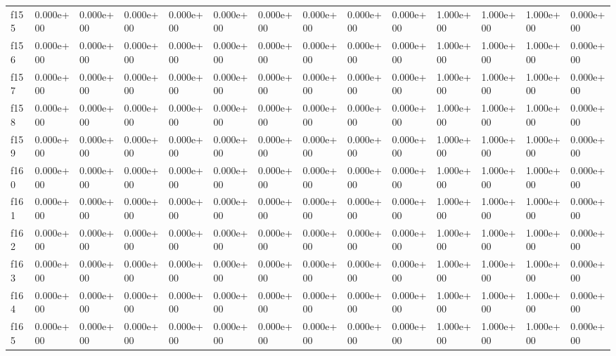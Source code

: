 \begin{table}
\begin{tabular}{llllllllllllll}
f155 & 0.000e+00 & 0.000e+00 & 0.000e+00 & 0.000e+00 & 0.000e+00 & 0.000e+00 & 0.000e+00 & 0.000e+00 & 0.000e+00 & 1.000e+00 & 1.000e+00 & 1.000e+00 & 0.000e+00 \\
f156 & 0.000e+00 & 0.000e+00 & 0.000e+00 & 0.000e+00 & 0.000e+00 & 0.000e+00 & 0.000e+00 & 0.000e+00 & 0.000e+00 & 1.000e+00 & 1.000e+00 & 1.000e+00 & 0.000e+00 \\
f157 & 0.000e+00 & 0.000e+00 & 0.000e+00 & 0.000e+00 & 0.000e+00 & 0.000e+00 & 0.000e+00 & 0.000e+00 & 0.000e+00 & 1.000e+00 & 1.000e+00 & 1.000e+00 & 0.000e+00 \\
f158 & 0.000e+00 & 0.000e+00 & 0.000e+00 & 0.000e+00 & 0.000e+00 & 0.000e+00 & 0.000e+00 & 0.000e+00 & 0.000e+00 & 1.000e+00 & 1.000e+00 & 1.000e+00 & 0.000e+00 \\
f159 & 0.000e+00 & 0.000e+00 & 0.000e+00 & 0.000e+00 & 0.000e+00 & 0.000e+00 & 0.000e+00 & 0.000e+00 & 0.000e+00 & 1.000e+00 & 1.000e+00 & 1.000e+00 & 0.000e+00 \\
f160 & 0.000e+00 & 0.000e+00 & 0.000e+00 & 0.000e+00 & 0.000e+00 & 0.000e+00 & 0.000e+00 & 0.000e+00 & 0.000e+00 & 1.000e+00 & 1.000e+00 & 1.000e+00 & 0.000e+00 \\
f161 & 0.000e+00 & 0.000e+00 & 0.000e+00 & 0.000e+00 & 0.000e+00 & 0.000e+00 & 0.000e+00 & 0.000e+00 & 0.000e+00 & 1.000e+00 & 1.000e+00 & 1.000e+00 & 0.000e+00 \\
f162 & 0.000e+00 & 0.000e+00 & 0.000e+00 & 0.000e+00 & 0.000e+00 & 0.000e+00 & 0.000e+00 & 0.000e+00 & 0.000e+00 & 1.000e+00 & 1.000e+00 & 1.000e+00 & 0.000e+00 \\
f163 & 0.000e+00 & 0.000e+00 & 0.000e+00 & 0.000e+00 & 0.000e+00 & 0.000e+00 & 0.000e+00 & 0.000e+00 & 0.000e+00 & 1.000e+00 & 1.000e+00 & 1.000e+00 & 0.000e+00 \\
f164 & 0.000e+00 & 0.000e+00 & 0.000e+00 & 0.000e+00 & 0.000e+00 & 0.000e+00 & 0.000e+00 & 0.000e+00 & 0.000e+00 & 1.000e+00 & 1.000e+00 & 1.000e+00 & 0.000e+00 \\
f165 & 0.000e+00 & 0.000e+00 & 0.000e+00 & 0.000e+00 & 0.000e+00 & 0.000e+00 & 0.000e+00 & 0.000e+00 & 0.000e+00 & 1.000e+00 & 1.000e+00 & 1.000e+00 & 0.000e+00 \\
\bottomrule
\end{tabular}
\end{table}
